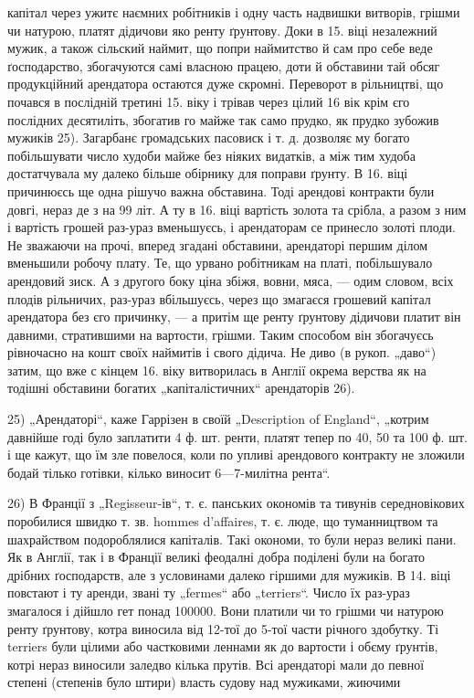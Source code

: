 капітал через ужитє наємних робітників і одну часть надвишки витворів, грішми чи натурою, платят
дідичови яко ренту ґрунтову. Доки в 15. віці незалежний мужик, а також сільский наймит, що попри
наймитство й сам про себе веде ґосподарство, збогачуются самі власною працею, доти й обставини тай
обсяг продукційний арендатора остаются дуже скромні. Переворот в рільництві, що почався в послідній
третині 15. віку і трівав через цілий 16 вік крім єго послідних десятиліть, збогатив го майже так
само прудко, як прудко зубожив мужиків 25). Загарбанє громадських пасовиск і т. д. дозволяє му
богато побільшувати число худоби майже без ніяких видатків, а між тим худоба достатчувала му далеко
більше обірнику для поправи ґрунту. В 16. віці причинюєсь ще одна рішучо важна обставина. Тоді
арендові контракти були довгі, нераз де з на 99 літ. А ту в 16. віці вартість золота та срібла, а
разом з ним і вартість грошей раз-ураз вменьшуєсь, і арендаторам се принесло золоті плоди. Не
зважаючи на прочі, вперед згадані обставини, арендаторі першим ділом вменьшили робочу плату. Те, що
урвано робітникам на платі, побільшувало
арендовий зиск. А з другого боку ціна збіжя, вовни, мяса, — одим словом, всіх плодів рільничих,
раз-ураз вбільшуєсь, через що змагаєся грошевий капітал арендатора
без єго причинку, — а притім ще ренту ґрунтову дідичови платит він давними, стратившими на вартости,
грішми. Таким способом він збогачуєсь рівночасно на кошт своїх наймитів і свого дідича. Не диво (в
рукоп. „даво“) затим, що вже с кінцем 16. віку витворилась в Англії окрема верства як на тодішні
обставини богатих „капіталістичних“ арендаторів 26).

25)  „Арендаторі“, каже Гаррізен в своїй „Description of England“, „котрим давнійше годі було
заплатити 4 ф. шт. ренти, платят тепер по 40, 50 та 100 ф. шт. і ще кажут, що їм зле повелося, коли
по упливі арендового контракту не зложили бодай тілько готівки, кілько виносит 6—7-милітна рента“.

26) В Франції з „Regisseur-ів“, т. є. панських окономів та тивунів середновікових поробилися швидко
т. зв. hommes d'affaires, т. є. люде, що туманництвом та шахрайством подороблялися капіталів. Такі
окономи, то були нераз великі пани. Як в Англії, так і в Франції великі феодалні добра поділені були
на богато дрібних ґосподарств, але з условинами далеко гіршими для мужиків. В 14. віці повстают і ту
аренди, звані ту „fermes“ або „terriers“. Число їх раз-ураз змагалося і дійшло гет понад
100000. Вони платили чи то грішми чи натурою ренту ґрунтову, котра виносила від 12-тої до 5-тої
части річного здобутку. Ті terriers були цілими або частковими леннами як до вартости і обєму
ґрунтів, котрі нераз виносили заледво кілька прутів. Всі арендаторі мали до певної степені (степенів
було штири) власть судову над мужиками, жиючими
